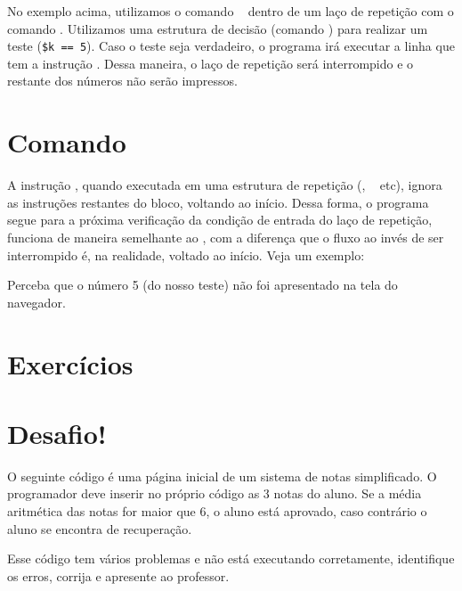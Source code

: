 

No exemplo acima, utilizamos o comando \comandobreak~ dentro de um laço de repetição com
o comando \comandofor. Utilizamos uma estrutura de decisão (comando \comandoif) para
realizar um teste (\texttt{\$k == 5}). Caso o teste seja verdadeiro, o programa
irá executar a linha que tem a instrução \comandobreak. Dessa maneira, o laço de 
repetição será interrompido e o restante dos números não serão impressos.

\section{Comando \comandocontinue}
\label{comando-continue}

A instrução \comandocontinue, quando executada em uma estrutura de repetição (\comandofor, 
\comandowhile~ etc), ignora as instruções restantes do bloco, voltando ao início. Dessa 
forma, o programa segue para a próxima verificação da condição de entrada do laço de repetição, 
funciona de maneira semelhante ao \comandobreak, com a diferença que o fluxo ao invés 
de ser interrompido é, na realidade, voltado ao início. Veja um exemplo:



Perceba que o número 5 (do nosso teste) não foi apresentado na tela do navegador.

\section{Exercícios}
\label{cap5-exercicios}

\section{Desafio!}
\label{cap5-desafio}
O seguinte código é uma página inicial de um sistema de notas simplificado.
O programador deve inserir no próprio código as 3 notas do aluno. Se a média aritmética 
das notas for maior que 6, o aluno está aprovado, caso contrário o aluno se encontra de 
recuperação.

Esse código tem vários problemas e não está executando corretamente, identifique os erros, 
corrija e apresente ao professor.

